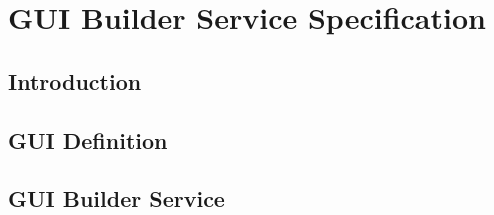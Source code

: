 \chapter{GUI Builder Service Specification}
\section{Introduction}
\section{GUI Definition}
\section{GUI Builder Service}
\orgcishellserviceguibuilder{}
